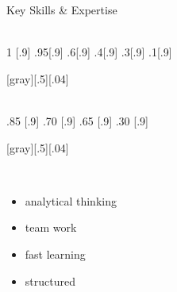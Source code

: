 \begin{frame}[t]{Key Skills \& Expertise}
%
  \vspace*{5mm}
  \begin{minipage}[c][.7\textheight][t]{.29\textwidth}\centering
    \\[2ex]
     {1} [.9\textwidth]\sg
          {.95}[.9\textwidth]\sg
          {.6}[.9\textwidth]\sg
          {.4}[.9\textwidth]\sg
          {.3}[.9\textwidth]\sg
          {.1}[.9\textwidth]\sg
  \end{minipage}[gray][.5][.04]
%
  \begin{minipage}[c][.7\textheight][t]{.3\textwidth}\centering
    \\[2ex]
              {.85} [.9\textwidth]\sg
               {.70} [.9\textwidth]\sg
    \motiv{\cpp}            {.65} [.9\textwidth]\sg
     {.30} [.9\textwidth]\sg
  \end{minipage}[gray][.5][.04]
%
  \begin{minipage}[c][.7\textheight][t]{.3\textwidth}\centering
    \\[2ex]
    \begin{itemize}
      \item analytical thinking\mg
      \item team work\mg
      \item fast learning\mg
      \item structured\mg
    \end{itemize}
  \end{minipage}
%
\end{frame}
